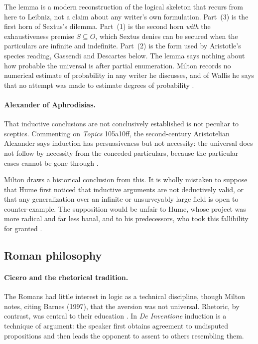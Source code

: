 The lemma is a modern reconstruction of the logical skeleton that recurs
from here to Leibniz, not a claim about any writer's own formulation.
Part~(3) is the first horn of Sextus's dilemma. Part~(1) is the second horn
\emph{with} the exhaustiveness premise $S\subseteq O$, which Sextus denies
can be secured when the particulars are infinite and indefinite. Part~(2)
is the form used by Aristotle's species reading, Gassendi and Descartes
below. The lemma says nothing about how probable the universal is after
partial enumeration. Milton records no numerical estimate of probability
in any writer he discusses, and of Wallis he says that no attempt was made
to estimate degrees of probability
\cite[p.~33]{Milton2011InductionBeforeHume}.

\paragraph{Alexander of Aphrodisias.}
That inductive conclusions are not conclusively established is not
peculiar to sceptics. Commenting on \emph{Topics} 105a10ff, the
second-century Aristotelian Alexander says induction has persuasiveness
but not necessity: the universal does not follow by necessity from the
conceded particulars, because the particular cases cannot be gone through
\cite[p.~10]{Milton2011InductionBeforeHume}.

Milton draws a historical conclusion from this. It is wholly mistaken to
suppose that Hume first noticed that inductive arguments are not
deductively valid, or that any generalization over an infinite or
unsurveyably large field is open to counter-example. The supposition would
be unfair to Hume, whose project was more radical and far less banal, and
to his predecessors, who took this fallibility for granted
\cite[p.~10]{Milton2011InductionBeforeHume}.

\subsection{Roman philosophy}

\paragraph{Cicero and the rhetorical tradition.}
The Romans had little interest in logic as a technical discipline,
though Milton notes, citing Barnes (1997), that the aversion was not
universal. Rhetoric, by contrast, was central to their education
\cite[p.~11]{Milton2011InductionBeforeHume}. In \emph{De Inventione}
induction is a technique of argument: the speaker first obtains agreement
to undisputed propositions and then leads the opponent to assent to
others resembling them.

